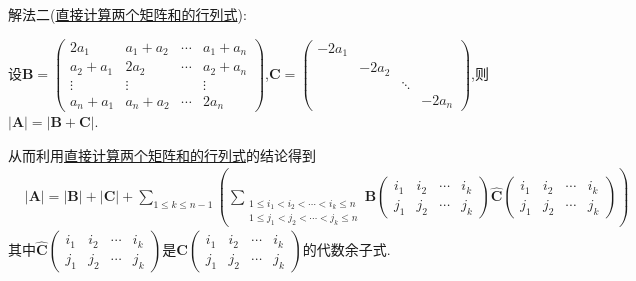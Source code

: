 \documentclass[lang=cn,newtx,10pt,scheme=chinese]{elegantbook}
\begin{document}
\begin{solution}
{\color{blue}解法二(\hyperref[proposition:直接计算两个矩阵和的行列式]{直接计算两个矩阵和的行列式}):}

设\(\boldsymbol{B}=\left(\begin{matrix}
    2a_1 & a_1 + a_2 & \cdots & a_1 + a_n\\
    a_2 + a_1 & 2a_2 & \cdots & a_2 + a_n\\
    \vdots & \vdots &  & \vdots\\
    a_n + a_1 & a_n + a_2 & \cdots & 2a_n
    \end{matrix}\right)\),\(\boldsymbol{C}=\left(\begin{matrix}
    -2a_1 &  &  & \\
    & -2a_2 &  & \\
    &  & \ddots & \\
    &  &  & -2a_n
    \end{matrix}\right)\),则\(|\boldsymbol{A}| = |\boldsymbol{B} + \boldsymbol{C}|\).
    
    从而利用\hyperref[proposition:直接计算两个矩阵和的行列式]{直接计算两个矩阵和的行列式}的结论得到
    \begin{align}\label{eq(行列式):1.5式}
       &|\boldsymbol{A}| = |\boldsymbol{B}| + |\boldsymbol{C}| + \sum_{1\leqslant k\leqslant n - 1}\left(\sum_{\begin{array}{c}
    1\leqslant i_1 < i_2 < \cdots < i_k\leqslant n\\
    1\leqslant j_1 < j_2 < \cdots < j_k\leqslant n
    \end{array}}\boldsymbol{B}\left(\begin{matrix}
    i_1 & i_2 & \cdots & i_k\\
    j_1 & j_2 & \cdots & j_k
    \end{matrix}\right)\widehat{\boldsymbol{C}}\left(\begin{matrix}
    i_1 & i_2 & \cdots & i_k\\
    j_1 & j_2 & \cdots & j_k
    \end{matrix}\right)\right)
    \end{align}
    其中\(\widehat{\boldsymbol{C}}\left(\begin{matrix}
    i_1 & i_2 & \cdots & i_k\\
    j_1 & j_2 & \cdots & j_k
    \end{matrix}\right)\)是\(\boldsymbol{C}\left(\begin{matrix}
    i_1 & i_2 & \cdots & i_k\\
    j_1 & j_2 & \cdots & j_k
    \end{matrix}\right)\)的代数余子式.
    

\end{solution}
\end{document}

